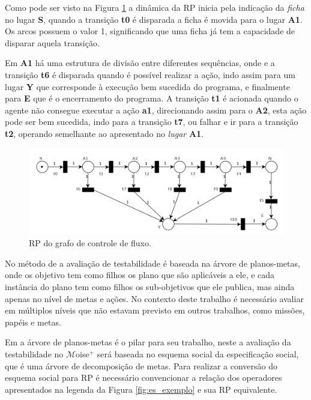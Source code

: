Como pode ser visto na Figura \ref{fig:cf_rp} a dinâmica da RP inicia pela indicação da \textit{ficha} no lugar \textbf{S}, quando a transição \textbf{t0} é disparada a ficha é movida para o lugar \textbf{A1}. Os arcos possuem o valor 1, significando que uma ficha já tem a capacidade de disparar aquela transição.

Em \textbf{A1} há uma estrutura de divisão entre diferentes sequências, onde e a transição \textbf{t6} é disparada quando é possível realizar a ação, indo assim para um lugar \textbf{Y} que corresponde à execução bem sucedida do programa, e finalmente para \textbf{E} que é o encerramento do programa. A transição \textbf{t1} é acionada quando o agente não consegue executar a ação \textbf{a1}, direcionando assim para o \textbf{A2}, esta ação pode ser bem sucedida, indo para a transição \textbf{t7}, ou falhar e ir para a transição \textbf{t2}, operando semelhante ao apresentado no \textit{lugar} \textbf{A1}.

\begin{figure}[ht]
    \centering
    \includegraphics[scale=0.4]{imagens/4-fluxo-rp2.png}
    \caption{RP do grafo de controle de fluxo.}
    \label{fig:cf_rp}
\end{figure}

No método de \cite{winikoff2014testability,winikoff2017bdi} a avaliação de testabilidade é baseada na árvore de planos-metas, onde os objetivo tem como filhos os plano que são aplicáveis a ele, e cada instância do plano tem como filhos os sub-objetivos que ele publica, mas ainda apenas no nível de metas e ações. No contexto deste trabalho é necessário avaliar em múltiplos níveis que não estavam previsto em outros trabalhos, como missões, papéis e metas.



Em \cite{winikoff2014testability} a árvore de planos-metas é o pilar para seu trabalho, neste a avaliação da testabilidade no $\mathcal{M}$oise$^{+}$ será baseada no esquema social da especificação social, que é uma árvore de decomposição de metas. Para realizar a conversão do esquema social para RP é necessário convencionar a relação dos operadores apresentados na legenda da Figura \ref{fig:es_exemplo} e sua RP equivalente.

